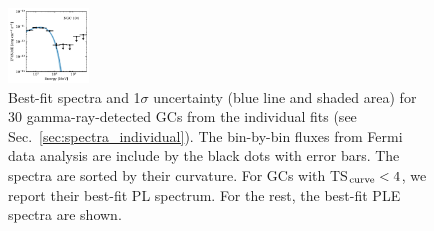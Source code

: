 \documentclass[doublespace,nopageskip]{VTthesis} %
\begin{document}
\begin{appendices}
\begin{figure}
\includegraphics[width=0.19\textwidth]{Figures/Globular/spectra/PLE_spectrum_3.pdf}
\caption{Best-fit spectra and 1$\sigma$ uncertainty (blue line and shaded area) for 30 gamma-ray-detected GCs from the individual fits (see Sec.~\ref{sec:spectra_individual}). The bin-by-bin fluxes from Fermi data analysis are include by the black dots with error bars. The spectra are sorted by their curvature. For GCs with TS$_{\rm curve} < 4$, we report their best-fit PL spectrum. For the rest, the best-fit PLE spectra are shown.}
\label{fig:spectra}
\end{figure}



\end{appendices}
\end{document}
